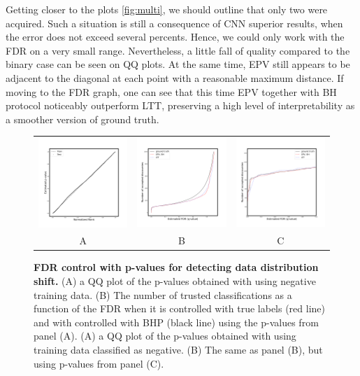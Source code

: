 \documentclass{article}
\begin{document}
Getting closer to the plots \ref{fig:multi}, we should outline that only two were acquired. Such a situation is still a consequence of CNN superior results, when the error does not exceed several percents. Hence, we could only work with the FDR on a very small range. Nevertheless, a little fall of quality compared to the binary case can be seen on QQ plots. At the same time, EPV still appears to be adjacent to the diagonal at each point with a reasonable maximum distance. If moving to the FDR graph, one can see that this time EPV together with BH protocol noticeably outperform LTT, preserving a high level of interpretability as a smoother version of ground truth.


\begin{figure}
    \centering
        \begin{tabular}{ccc}
 		\includegraphics[width=2in]{img/cnn_QQ_shifted.png} &
		\includegraphics[width=2in]{img/cnn_shifted_fdr_control.png} & 
            \includegraphics[width=2in]{img/cnn_shifted_fdr_control_loc.png}
		\\	
		A & B & C
	\end{tabular}
	\caption{{\bf  FDR control with p-values for detecting data distribution shift.}
		(A) a QQ plot of the p-values obtained with using negative training data. (B) The number of trusted classifications as a function of the FDR when it is controlled with true labels (red line) and with controlled with BHP (black line) using the p-values from panel (A).
		(A) a QQ plot of the p-values obtained with using training data classified as negative. (B) The same as panel (B), but using p-values from panel (C).
	}
	\label{fig:shift}
\end{figure}
\end{document}
